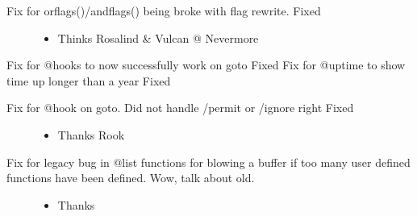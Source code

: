 \documentclass[letterpaper,10pt,english]{sphinxmanual}
\begin{document}
\begin{description}
\begin{itemize}
\end{itemize}

\item[{Fix for orflags()/andflags() being broke with flag rewrite. \sphinxhyphen{} Fixed}] \leavevmode\begin{itemize}
\item {} 
\sphinxAtStartPar
Thinks Rosalind \& Vulcan @ Nevermore

\end{itemize}

\end{description}

\sphinxAtStartPar
Fix for @hooks to now successfully work on goto \sphinxhyphen{} Fixed
Fix for @uptime to show time up longer than a year \sphinxhyphen{} Fixed
\begin{description}
\item[{Fix for @hook on goto.  Did not handle /permit or /ignore right \sphinxhyphen{} Fixed}] \leavevmode\begin{itemize}
\item {} 
\sphinxAtStartPar
Thanks Rook

\end{itemize}

\item[{Fix for legacy bug in @list functions for blowing a buffer if too many user defined functions have been defined.  Wow, talk about old.}] \leavevmode\begin{itemize}
\item {} 
\sphinxAtStartPar
Thanks 

\end{itemize}

\end{description}
\end{document}
